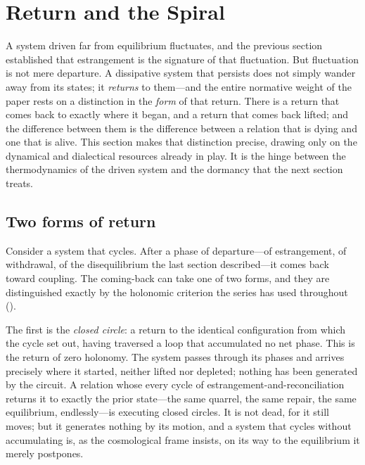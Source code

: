 \section{Return and the Spiral}
\label{p17:sec:return}

\noindent
A system driven far from equilibrium fluctuates, and the previous section established that estrangement is the signature of that fluctuation. But fluctuation is not mere departure. A dissipative system that persists does not simply wander away from its states; it \emph{returns} to them---and the entire normative weight of the paper rests on a distinction in the \emph{form} of that return. There is a return that comes back to exactly where it began, and a return that comes back lifted; and the difference between them is the difference between a relation that is dying and one that is alive. This section makes that distinction precise, drawing only on the dynamical and dialectical resources already in play. It is the hinge between the thermodynamics of the driven system and the dormancy that the next section treats.

\subsection{Two forms of return}
\label{p17:sub:return-two}

Consider a system that cycles. After a phase of departure---of estrangement, of withdrawal, of the disequilibrium the last section described---it comes back toward coupling. The coming-back can take one of two forms, and they are distinguished exactly by the holonomic criterion the series has used throughout ().

The first is the \emph{closed circle}: a return to the identical configuration from which the cycle set out, having traversed a loop that accumulated no net phase. This is the return of zero holonomy. The system passes through its phases and arrives precisely where it started, neither lifted nor depleted; nothing has been generated by the circuit. A relation whose every cycle of estrangement-and-reconciliation returns it to exactly the prior state---the same quarrel, the same repair, the same equilibrium, endlessly---is executing closed circles. It is not dead, for it still moves; but it generates nothing by its motion, and a system that cycles without accumulating is, as the cosmological frame insists, on its way to the equilibrium it merely postpones.

